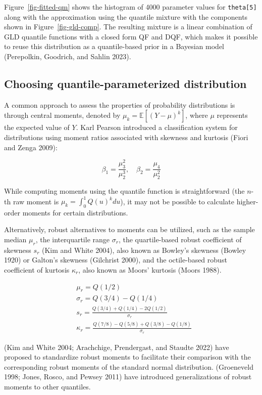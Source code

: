 \documentclass[
]{interact}
\begin{document}
Figure~\ref{fig-fitted-qm} shows the histogram of 4000 parameter values
for \texttt{theta{[}5{]}} along with the approximation using the
quantile mixture with the components shown in Figure~\ref{fig-gld-comp}.
The resulting mixture is a linear combination of GLD quantile functions
with a closed form QF and DQF, which makes it possible to reuse this
distribution as a quantile-based prior in a Bayesian model (Perepolkin,
Goodrich, and Sahlin 2023).

\subsection{Choosing quantile-parameterized
distribution}\label{sec-compareqf}

A common approach to assess the properties of probability distributions
is through central moments, denoted by \(\mu_k=\mathbb{E}[(Y-\mu)^k]\),
where \(\mu\) represents the expected value of \(Y\). Karl Pearson
introduced a classification system for distributions using moment ratios
associated with skewness and kurtosis (Fiori and Zenga 2009):

\[
\beta_1=\frac{\mu_3^2}{\mu_2^3},\quad \beta_2=\frac{\mu_4}{\mu_2^2}
\]

While computing moments using the quantile function is straightforward
(the \(n\)-th raw moment is \(\mu_k=\int_0^1Q(u)^kdu\)), it may not be
possible to calculate higher-order moments for certain distributions.

Alternatively, robust alternatives to moments can be utilized, such as
the sample median \(\mu_r\), the interquartile range \(\sigma_r\), the
quartile-based robust coefficient of skewness \(s_r\) (Kim and White
2004), also known as Bowley's skewness (Bowley 1920) or Galton's
skewness (Gilchrist 2000), and the octile-based robust coefficient of
kurtosis \(\kappa_r\), also known as Moors' kurtosis (Moors 1988).

\[
\begin{aligned}
&\mu_r=Q(1/2)\\
&\sigma_r=Q(3/4)-Q(1/4)\\
&s_r=\frac{Q(3/4)+Q(1/4)-2Q(1/2)}{\sigma_r}\\
&\kappa_r=\frac{Q(7/8)-Q(5/8)+Q(3/8)-Q(1/8)}{\sigma_r}
\end{aligned}
\]

(Kim and White 2004; Arachchige, Prendergast, and Staudte 2022) have
proposed to standardize robust moments to facilitate their comparison
with the corresponding robust moments of the standard normal
distribution. (Groeneveld 1998; Jones, Rosco, and Pewsey 2011) have
introduced generalizations of robust moments to other quantiles.
\end{document}
